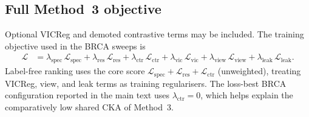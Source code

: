 \subsection{Full Method~3 objective}

Optional VICReg and demoted contrastive terms may be included. The training objective used in the BRCA sweeps is
\begin{equation}
\begin{aligned}
\mathcal{L}
&=
\lambda_{\mathrm{spec}}\,\mathcal{L}_{\mathrm{spec}}
+\lambda_{\mathrm{res}}\,\mathcal{L}_{\mathrm{res}}
+\lambda_{\mathrm{ctr}}\,\mathcal{L}_{\mathrm{ctr}}
+\lambda_{\mathrm{vic}}\,\mathcal{L}_{\mathrm{vic}}
+\lambda_{\mathrm{view}}\,\mathcal{L}_{\mathrm{view}}
+\lambda_{\mathrm{leak}}\,\mathcal{L}_{\mathrm{leak}}.
\end{aligned}
\end{equation}
Label-free ranking uses the core score $\mathcal{L}_{\mathrm{spec}}+\mathcal{L}_{\mathrm{res}}+\mathcal{L}_{\mathrm{ctr}}$ (unweighted), treating VICReg, view, and leak terms as training regularisers. The loss-best BRCA configuration reported in the main text uses $\lambda_{\mathrm{ctr}}=0$, which helps explain the comparatively low shared CKA of Method~3.
